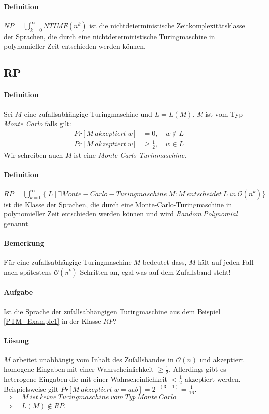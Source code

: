 \paragraph{Definition}
$NP = \bigcup\limits_{k=0}^{\infty} NTIME(n^k)$ ist die nichtdeterministische Zeitkomplexitätsklasse der Sprachen, die durch eine nichtdeterministische Turingmaschine in polynomieller Zeit entschieden werden können.


\subsection{RP}
\paragraph{Definition}
Sei $M$ eine zufallsabhängige Turingmaschine und $L = L(M)$. $M$ ist vom Typ \emph{Monte Carlo} falls gilt:
\begin{align*}
	Pr[M\ akzeptiert\ w] & = 0,\quad w \notin L \\
	Pr[M\ akzeptiert\ w] & \geq \frac{1}{2},\quad w \in L
\end{align*}
Wir schreiben auch $M$ ist eine \emph{Monte-Carlo-Turinmaschine}.

\paragraph{Definition}
$RP = \bigcup\limits_{k=0}^{\infty} \bigl\{\ L\ \bigl\lvert\ \exists Monte-Carlo-Turingmaschine\ M : M\ entscheidet\ L\ in\ \mathcal{O}(n^k) \bigl\}$ ist die Klasse der Sprachen, die durch eine Monte-Carlo-Turingmaschine in polynomieller Zeit entschieden werden können und wird \emph{Random Polynomial} genannt.

\paragraph{Bemerkung}
Für eine zufallsabhängige Turingmaschine $M$ bedeutet dass, $M$ hält auf jeden Fall nach spätestens $\mathcal{O}(n^k)$ Schritten an, egal was auf dem Zufallsband steht!

\paragraph{Aufgabe}
Ist die Sprache der zufallsabhängigen Turingmaschine aus dem Beispiel \ref{PTM_Example1} in der Klasse $RP$?

\paragraph{Lösung}
$M$ arbeitet unabhängig vom Inhalt des Zufallsbandes in $\mathcal{O}(n)$ und akzeptiert homogene Eingaben mit einer Wahrscheinlichkeit $\geq \frac{1}{2}$.
Allerdings gibt es heterogene Eingaben die mit einer Wahrscheinlichkeit $< \frac{1}{2}$ akzeptiert werden.
Beispielsweise gilt $Pr[M\ akzeptiert\ w=aab] = 2^{-(3+1)} = \frac{1}{16}$. \\
$\Rightarrow \quad M\ ist\ keine\ Turingmaschine\ vom\ Typ\ Monte\ Carlo$ \\
$\Rightarrow \quad L(M) \notin RP$.

